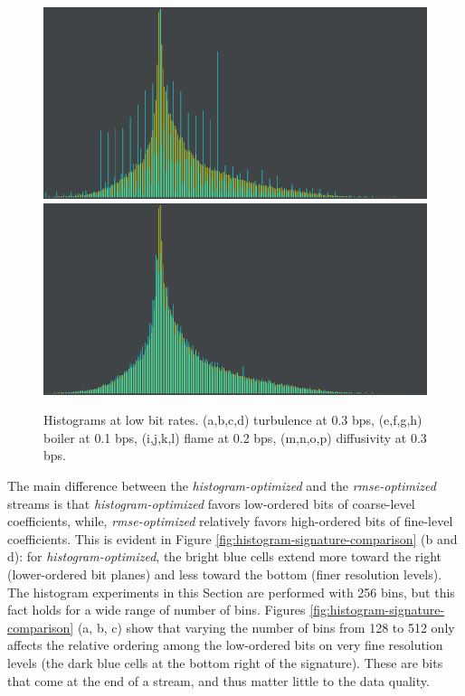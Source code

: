 \begin{figure}
	{\includegraphics[width=0.24\linewidth]{img/histogram/diffusivity-wlz/wavenorm.png}}
	{\includegraphics[width=0.24\linewidth]{img/histogram/diffusivity-wlz/signature.png}}
	\caption{Histograms at low bit rates. (a,b,c,d) turbulence at 0.3 bps, (e,f,g,h) boiler at 0.1
	bps, (i,j,k,l) flame at 0.2 bps, (m,n,o,p) diffusivity at 0.3 bps.}
	\label{fig:histogram-comparison-low-bit-rate}
\end{figure}

The main difference between the \emph{histogram-optimized} and the \emph{rmse-optimized} streams is
that \emph{histogram-optimized} favors low-ordered bits of coarse-level coefficients, while,
\emph{rmse-optimized} relatively favors high-ordered bits of fine-level coefficients. This is
evident in Figure \ref{fig:histogram-signature-comparison} (b and d): for
\emph{histogram-optimized}, the bright blue cells extend more toward the right (lower-ordered bit
planes) and less toward the bottom (finer resolution levels). The histogram experiments in this
Section are performed with 256 bins, but this fact holds for a wide range of number of bins. Figures
\ref{fig:histogram-signature-comparison} (a, b, c) show that varying the number of bins from 128 to
512 only affects the relative ordering among the low-ordered bits on very fine resolution levels
(the dark blue cells at the bottom right of the signature). These are bits that come at the end of a
stream, and thus matter little to the data quality. 
 
